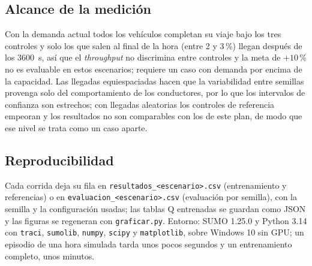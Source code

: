 \subsection*{Alcance de la medición}

Con la demanda actual todos los vehículos completan su viaje bajo los
tres controles y solo los que salen al final de la hora (entre 2 y
3\,\%) llegan después de los 3600~s, así que el \textit{throughput} no
discrimina entre controles y la meta de $+10\,\%$ no es evaluable en
estos escenarios; requiere un caso con demanda por encima de la
capacidad.
Las llegadas equiespaciadas hacen que la variabilidad entre semillas
provenga solo del comportamiento de los conductores, por lo que los
intervalos de confianza son estrechos; con llegadas aleatorias los
controles de referencia empeoran y los resultados no son comparables
con los de este plan, de modo que ese nivel se trata como un caso
aparte.

\subsection*{Reproducibilidad}

Cada corrida deja su fila en \texttt{resultados\_<escenario>.csv}
(entrenamiento y referencias) o en \texttt{evaluacion\_<escenario>.csv}
(evaluación por semilla), con la semilla y la configuración usadas; las
tablas Q entrenadas se guardan como JSON y las figuras se regeneran con
\texttt{graficar.py}. Entorno: SUMO 1.25.0 y Python 3.14 con
\texttt{traci}, \texttt{sumolib}, \texttt{numpy}, \texttt{scipy} y
\texttt{matplotlib}, sobre Windows 10 sin GPU; un episodio de una hora
simulada tarda unos pocos segundos y un entrenamiento completo, unos
minutos.
